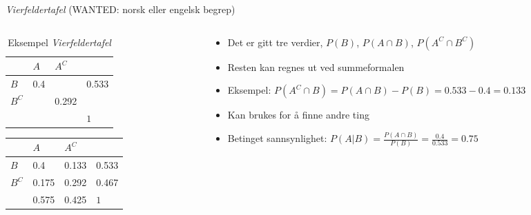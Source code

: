 \begin{frame}{\textit{Vierfeldertafel} (WANTED: norsk eller engelsk begrep)}
\begin{columns}
 \begin{column}{0.38\textwidth}
\begin{table}[h!]
\centering
\caption{Eksempel \textit{Vierfeldertafel}}
\label{tab:fourfold_eksempel1}
\begin{tabular}{l|ll|l}
\cline{2-3}
                            & $A$            & $A^C$            &                               \\ \hline
\multicolumn{1}{|l|}{$B$}   & 0.4   &     & \multicolumn{1}{l|}{0.533}   \\
\multicolumn{1}{|l|}{$B^C$} &   & 0.292 & \multicolumn{1}{l|}{} \\ \hline
                            &          &          & \multicolumn{1}{l|}{$1$}      \\ \cline{2-4} 
\end{tabular}
\end{table}

\begin{table}[h!]
\centering
\label{tab:fourfold_eksempel2}
\begin{tabular}{l|ll|l}
\cline{2-3}
                            & $A$            & $A^C$            &                               \\ \hline
\multicolumn{1}{|l|}{$B$}   & 0.4   & 0.133    & \multicolumn{1}{l|}{0.533}   \\
\multicolumn{1}{|l|}{$B^C$} & 0.175  & 0.292 & \multicolumn{1}{l|}{0.467} \\ \hline
                            & 0.575         & 0.425         & \multicolumn{1}{l|}{$1$}      \\ \cline{2-4} 
\end{tabular}
\end{table}
 \end{column}
 \pause
 \begin{column}{0.58\textwidth}
\begin{itemize}[<+->]
\item Det er gitt tre verdier, $P(B)$, $P(A\cap B)$, $P(A^C\cap B^C)$
\item Resten kan regnes ut ved summeformalen
\item Eksempel: $P(A^C\cap B)=P(A\cap B)-P(B)=0.533-0.4=0.133$
\item Kan brukes for å finne andre ting
\item Betinget sannsynlighet: $P(A|B)=\frac{P(A\cap B)}{P(B)}=\frac{0.4}{0.533}=0.75$
\end{itemize}
 \end{column}
\end{columns}
\end{frame}

